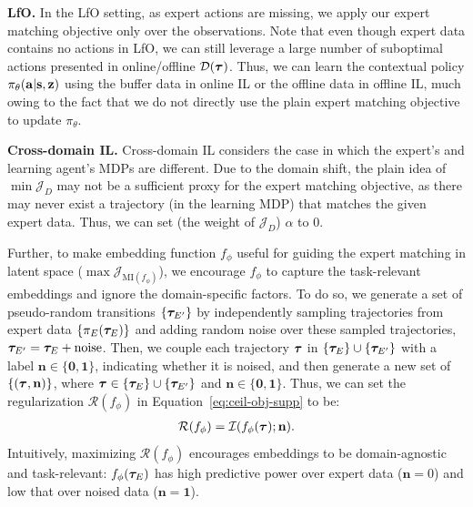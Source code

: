 \textbf{LfO.} In the LfO setting, as expert actions are missing, we apply our expert matching objective only over the observations. %
Note that even though expert data contains no actions in LfO, we can still leverage a large number of suboptimal actions presented in online/offline $\mathcal{D({\bm{\tau}})}$. 
Thus, we can learn the contextual policy $\pi_\theta(\mathbf{a}|\mathbf{s},{\mathbf{z}})$ using the buffer data in online IL or the offline data in offline IL, much owing to the fact that we do not directly use the plain expert matching objective to update $\pi_\theta$. 

\textbf{Cross-domain IL.} Cross-domain IL considers the case in which the expert’s and learning agent’s MDPs are different. %
Due to the domain shift, the plain idea of $\min \mathcal{J}_D$ may not be a sufficient proxy for the expert matching objective, as there may never exist a trajectory (in the learning MDP) that matches the given expert data. 
Thus, we can set (the weight of $\mathcal{J}_D$) $\alpha$ to $0$. 

Further, to make embedding function $f_\phi$ useful for guiding the expert matching in latent space (\ie $\max \mathcal{J}_{\text{MI}(f_\phi)}$), %
we encourage $f_\phi$ to capture the task-relevant embeddings and ignore the domain-specific factors. 
To do so, we generate a set of pseudo-random transitions $\{{\bm{\tau}}_{E'}\}$ by independently sampling trajectories from expert data $\{\pi_E({\bm{\tau}}_{E})\}$ and adding random noise over these sampled trajectories, \ie ${\bm{\tau}}_{E'} = {\bm{\tau}}_{E} + \text{noise}$. Then, we couple each trajectory ${\bm{\tau}}$ in $\{{\bm{\tau}}_{E}\}\cup\{{\bm{\tau}}_{E'}\}$ with a label $\mathbf{n} \in \{\mathbf{0}, \mathbf{1}\}$, indicating whether it is noised, and then generate a new set of $\{({\bm{\tau}}, \mathbf{n})\}$, where ${\bm{\tau}} \in \{{\bm{\tau}}_{E}\}\cup\{{\bm{\tau}}_{E'}\}$ and $\mathbf{n} \in \{\mathbf{0}, \mathbf{1}\}$. Thus, we can set the regularization $\mathcal{R}(f_\phi)$ in Equation~\ref{eq:ceil-obj-supp} to be:
\begin{align}
	\mathcal{R}(f_\phi)  = \mathcal{I}(f_\phi({\bm{\tau}}); \mathbf{n}).
\end{align} 
Intuitively, maximizing $\mathcal{R}(f_\phi)$ encourages embeddings to be domain-agnostic and task-relevant: $f_\phi({\bm{\tau}}_E)$ has high predictive power over expert data ($\mathbf{n}=0$) and low that over noised data ($\mathbf{n}=\mathbf{1}$). 


